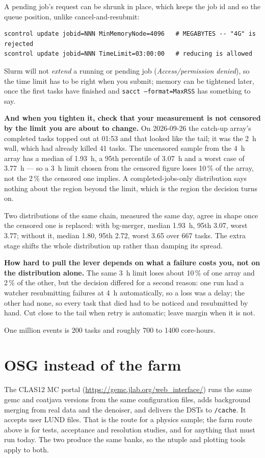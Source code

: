 \documentclass[11pt]{article}
\begin{document}
A pending job's request can be shrunk in place, which keeps the job id and so the queue
position, unlike cancel-and-resubmit:
\begin{lstlisting}
scontrol update jobid=NNN MinMemoryNode=4096   # MEGABYTES -- "4G" is rejected
scontrol update jobid=NNN TimeLimit=03:00:00   # reducing is allowed
\end{lstlisting}
Slurm will not \emph{extend} a running or pending job (\emph{Access/permission denied}), so the
time limit has to be right when you submit; memory can be tightened later, once the first tasks
have finished and \texttt{sacct --format=MaxRSS} has something to say.

\textbf{And when you tighten it, check that your measurement is not censored by the limit you
are about to change.} On 2026-09-26 the catch-up array's completed tasks topped out at 01:53
and that looked like the tail; it was the 2~h wall, which had already killed 41 tasks. The
uncensored sample from the 4~h array has a median of 1.93~h, a 95th percentile of 3.07~h and a
worst case of 3.77~h --- so a 3~h limit chosen from the censored figure loses 10\,\% of the
array, not the 2\,\% the censored one implies. A completed-jobs-only distribution says nothing
about the region beyond the limit, which is the region the decision turns on.

Two distributions of the same chain, measured the same day, agree in shape once the censored
one is replaced: with bg-merger, median 1.93~h, 95th 3.07, worst 3.77; without it, median 1.80,
95th 2.72, worst 3.65 over 667 tasks. The extra stage shifts the whole distribution up rather
than damping its spread.

\textbf{How hard to pull the lever depends on what a failure costs you, not on the
distribution alone.} The same 3~h limit loses about 10\,\% of one array and 2\,\% of the other,
but the decision differed for a second reason: one run had a watcher resubmitting failures at
4~h automatically, so a loss was a delay; the other had none, so every task that died had to be
noticed and resubmitted by hand. Cut close to the tail when retry is automatic; leave margin
when it is not.

One million events is 200 tasks and roughly 700 to 1400 core-hours.

\section{OSG instead of the farm}
The CLAS12 MC portal (\url{https://gemc.jlab.org/web_interface/}) runs the same gemc and coatjava
versions from the same configuration files, adds background merging from real data and the
denoiser, and delivers the DSTs to \texttt{/cache}. It accepts user LUND files. That is the route
for a physics sample; the farm route above is for tests, acceptance and resolution studies, and
for anything that must run today. The two produce the same banks, so the ntuple and plotting
tools apply to both.
\end{document}
